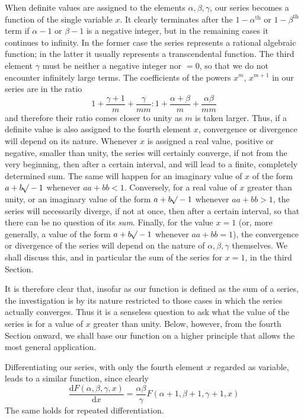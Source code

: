 When definite values are assigned to the elements $\alpha,\beta,\gamma$, our series becomes a function of the single variable $x$. It clearly terminates after the $1-\alpha^{\mathrm{th}}$ or $1-\beta^{\mathrm{th}}$ term if $\alpha-1$ or $\beta-1$ is a negative integer, but in the remaining cases it continues to infinity. In the former case the series represents a rational algebraic function; in the latter it usually represents a transcendental function. The third element $\gamma$ must be neither a negative integer nor $=0$, so that we do not encounter infinitely large terms.
The coefficients of the powers $x^m$, $x^{m+1}$ in our series are in the ratio
\[
1+\frac{\gamma+1}{m}+\frac{\gamma}{mm}:1+\frac{\alpha+\beta}{m}+\frac{\alpha\beta}{mm}
\]
and therefore their ratio comes closer to unity as $m$ is taken larger. Thus, if a definite value is also assigned to the fourth element $x$, convergence or divergence will depend on its nature. Whenever $x$ is assigned a real value, positive or negative, smaller than unity, the series will certainly converge, if not from the very beginning, then after a certain interval, and will lead to a finite, completely determined sum. The same will happen for an imaginary value of $x$ of the form $a+b\mathord{{}^{}\!\surd}-1$ whenever $aa+bb<1$. Conversely, for a real value of $x$ greater than unity, or an imaginary value of the form $a+b\mathord{{}^{}\!\surd}-1$ whenever $aa+bb>1$, the series will necessarily diverge, if not at once, then after a certain interval, so that there can be no question of its \textit{sum}. Finally, for the value $x=1$ (or, more generally, a value of the form $a+b\mathord{{}^{}\!\surd}-1$ whenever $aa+bb=1$), the convergence or divergence of the series will depend on the nature of $\alpha,\beta,\gamma$ themselves. We shall discuss this, and in particular the sum of the series for $x=1$, in the third Section.

It is therefore clear that, insofar as our function is defined as the sum of a series, the investigation is by its nature restricted to those cases in which the series actually converges. Thus it is a senseless question to ask what the value of the series is for a value of $x$ greater than unity. Below, however, from the fourth Section onward, we shall base our function on a higher principle that allows the most general application.

Differentiating our series, with only the fourth element $x$ regarded as variable, leads to a similar function, since clearly
\[
\frac{\mathrm{d}F(\alpha,\beta,\gamma,x)}{\mathrm{d}x}
=\frac{\alpha\beta}{\gamma}F(\alpha+1,\beta+1,\gamma+1,x)
\]
The same holds for repeated differentiation.


